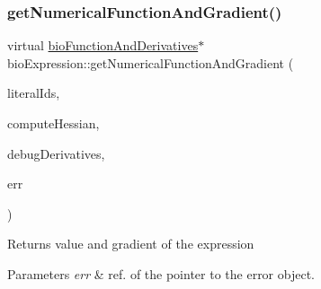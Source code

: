 \subsubsection{\texorpdfstring{get\+Numerical\+Function\+And\+Gradient()}{getNumericalFunctionAndGradient()}}
{\footnotesize\ttfamily virtual \hyperlink{classbio_function_and_derivatives}{bio\+Function\+And\+Derivatives}$\ast$ bio\+Expression\+::get\+Numerical\+Function\+And\+Gradient (\begin{DoxyParamCaption}\item[{vector$<$ pat\+U\+Long $>$}]{literal\+Ids,  }\item[{pat\+Boolean}]{compute\+Hessian,  }\item[{pat\+Boolean}]{debug\+Derivatives,  }\item[{pat\+Error $\ast$\&}]{err }\end{DoxyParamCaption})\hspace{0.3cm}{\ttfamily [virtual]}}

\begin{DoxyReturn}{Returns}
value and gradient of the expression 
\end{DoxyReturn}

\begin{DoxyParams}{Parameters}
{\em err} & ref. of the pointer to the error object. \\
\hline
\end{DoxyParams}


